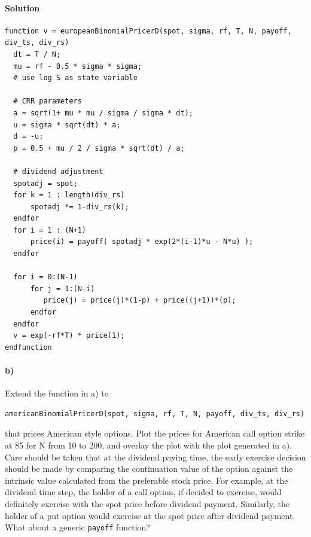 \documentclass[12pt,a4paper,hidelinks,fleqn]{article}            %
\begin{document}
\paragraph{Solution}
\begin{verbatim}
function v = europeanBinomialPricerD(spot, sigma, rf, T, N, payoff, div_ts, div_rs)
  dt = T / N;
  mu = rf - 0.5 * sigma * sigma;
  # use log S as state variable
  
  # CRR parameters
  a = sqrt(1+ mu * mu / sigma / sigma * dt);
  u = sigma * sqrt(dt) * a;
  d = -u;
  p = 0.5 + mu / 2 / sigma * sqrt(dt) / a;

  # dividend adjustment
  spotadj = spot;
  for k = 1 : length(div_rs)
      spotadj *= 1-div_rs(k);
  endfor
  for i = 1 : (N+1)
      price(i) = payoff( spotadj * exp(2*(i-1)*u - N*u) );
  endfor

  for i = 0:(N-1)
      for j = 1:(N-i)
         price(j) = price(j)*(1-p) + price((j+1))*(p);
      endfor
  endfor
  v = exp(-rf*T) * price(1);
endfunction
\end{verbatim}

\vspace{-1cm}
\paragraph{b)} Extend the function in a) to 
\vspace{-5mm}
\begin{verbatim}
americanBinomialPricerD(spot, sigma, rf, T, N, payoff, div_ts, div_rs)
\end{verbatim}
\vspace{-5mm}
that prices American style options. 
Plot the prices for American call option strike at 85 for N from 10 to 200, and overlay the plot with the plot generated in a). 
Care should be taken that at the dividend paying time, 
the early exercise decision should be made by comparing the continuation value of the option against the intrinsic value calculated from the preferable stock price.
For example, at the dividend time step, the holder of a call option, if decided to exercise, would definitely exercise with the spot price before dividend payment.
Similarly, the holder of a put option would exercise at the spot price after dividend payment.
What about a generic \verb=payoff= function? 
\end{document}
